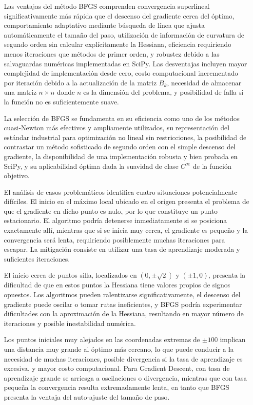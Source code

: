 \documentclass[12pt,a4paper]{article}
\begin{document}
Las ventajas del método BFGS comprenden convergencia superlineal significativamente más rápida que el descenso del gradiente cerca del óptimo, comportamiento adaptativo mediante búsqueda de línea que ajusta automáticamente el tamaño del paso, utilización de información de curvatura de segundo orden sin calcular explícitamente la Hessiana, eficiencia requiriendo menos iteraciones que métodos de primer orden, y robustez debido a las salvaguardas numéricas implementadas en SciPy. Las desventajas incluyen mayor complejidad de implementación desde cero, costo computacional incrementado por iteración debido a la actualización de la matriz $B_k$, necesidad de almacenar una matriz $n \times n$ donde $n$ es la dimensión del problema, y posibilidad de falla si la función no es suficientemente suave.

La selección de BFGS se fundamenta en su eficiencia como uno de los métodos cuasi-Newton más efectivos y ampliamente utilizados, su representación del estándar industrial para optimización no lineal sin restricciones, la posibilidad de contrastar un método sofisticado de segundo orden con el simple descenso del gradiente, la disponibilidad de una implementación robusta y bien probada en SciPy, y su aplicabilidad óptima dada la suavidad de clase $C^{\infty}$ de la función objetivo.

El análisis de casos problemáticos identifica cuatro situaciones potencialmente difíciles. El inicio en el máximo local ubicado en el origen presenta el problema de que el gradiente en dicho punto es nulo, por lo que constituye un punto estacionario. El algoritmo podría detenerse inmediatamente si se posiciona exactamente allí, mientras que si se inicia muy cerca, el gradiente es pequeño y la convergencia será lenta, requiriendo posiblemente muchas iteraciones para escapar. La mitigación consiste en utilizar una tasa de aprendizaje moderada y suficientes iteraciones.

El inicio cerca de puntos silla, localizados en $(0, \pm\sqrt{2})$ y $(\pm 1, 0)$, presenta la dificultad de que en estos puntos la Hessiana tiene valores propios de signos opuestos. Los algoritmos pueden ralentizarse significativamente, el descenso del gradiente puede oscilar o tomar rutas ineficientes, y BFGS podría experimentar dificultades con la aproximación de la Hessiana, resultando en mayor número de iteraciones y posible inestabilidad numérica.

Los puntos iniciales muy alejados en las coordenadas extremas de $\pm 100$ implican una distancia muy grande al óptimo más cercano, lo que puede conducir a la necesidad de muchas iteraciones, posible divergencia si la tasa de aprendizaje es excesiva, y mayor costo computacional. Para Gradient Descent, con tasa de aprendizaje grande se arriesga a oscilaciones o divergencia, mientras que con tasa pequeña la convergencia resulta extremadamente lenta, en tanto que BFGS presenta la ventaja del auto-ajuste del tamaño de paso.
\end{document}
